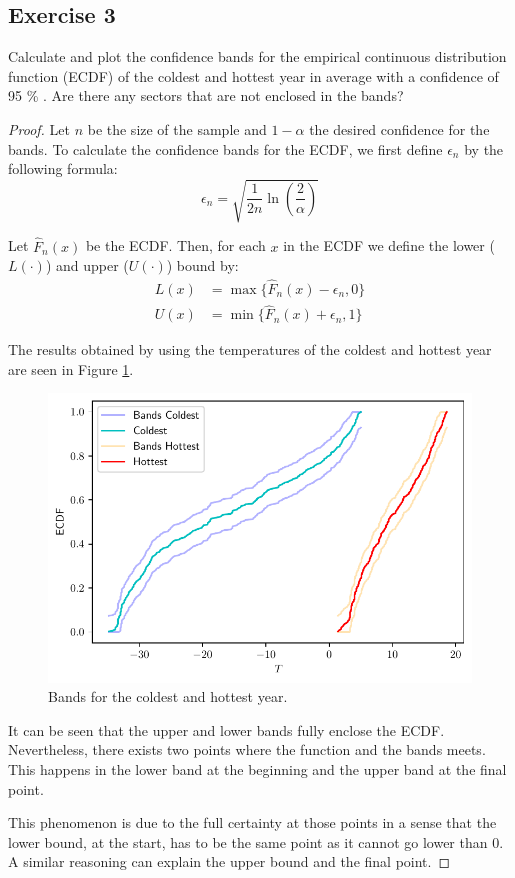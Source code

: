 \documentclass[11pt]{article}
\theoremstyle{definition}
\theoremstyle{remark}
\theoremstyle{remark}
\begin{document}
\subsection*{Exercise 3}
Calculate and plot the confidence bands for the empirical continuous
distribution function (ECDF) of the coldest and hottest year in
average with a confidence of 95 \% . Are there any sectors that are
not enclosed in the bands?

\begin{proof}
  Let $n$ be the size of the sample and $1 - \alpha$ the desired
  confidence for the bands. To calculate the confidence bands for the
  ECDF, we first define $\epsilon_n$ by the following formula:
  \begin{equation*}
    \epsilon_n = \sqrt{\frac{1}{2n} \ln\left(\frac{2}{\alpha}\right)}
  \end{equation*}

  Let $\hat{F}_n(x)$ be the ECDF. Then, for each $x$ in the ECDF we
  define the lower ($L(\cdot)$) and upper ($U(\cdot)$) bound by:
  \begin{align*}
    L(x) &= \max\{\hat{F}_n(x) - \epsilon_n, 0\} \\
    U(x) &= \min\{\hat{F}_n(x) + \epsilon_n, 1\}
  \end{align*}

  The results obtained by using the temperatures of the coldest and
  hottest year are seen in Figure \ref{fig:ex3}.
  \begin{figure}[H]
    \centering
    \includegraphics[scale=0.5]{../figs/ecdf_bands.pdf}
    \caption{Bands for the coldest and hottest year.}
    \label{fig:ex3}
  \end{figure}

  It can be seen that the upper and lower bands fully enclose the
  ECDF. Nevertheless, there exists two points where the function and
  the bands meets. This happens in the lower band at the beginning and
  the upper band at the final point.

  This phenomenon is due to the full certainty at those points in a
  sense that the lower bound, at the start, has to be the same point
  as it cannot go lower than 0. A similar reasoning can explain the
  upper bound and the final point.
\end{proof}
\end{document}
